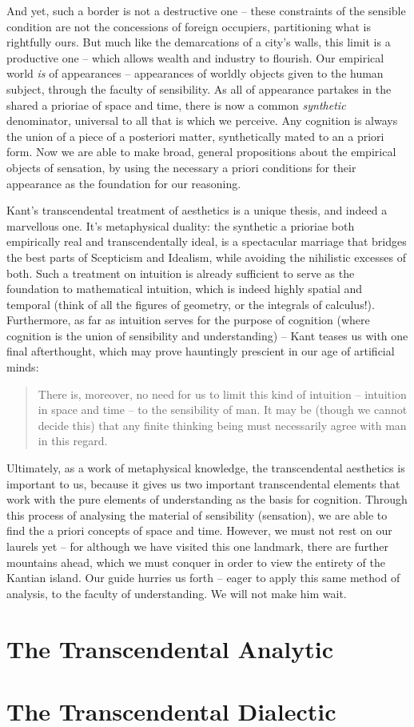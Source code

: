 \noindent
And yet, such a border is not a destructive one -- these constraints of the sensible condition are not the concessions of foreign occupiers, partitioning what is rightfully ours. But much like the demarcations of a city's walls, this limit is a productive one -- which allows wealth and industry to flourish. Our empirical world \emph{is} of appearances -- appearances of worldly objects given to the human subject, through the faculty of sensibility. As all of appearance partakes in the shared a prioriae of space and time, there is now a common \emph{synthetic} denominator, universal to all that is which we perceive. Any cognition is always the union of a piece of a posteriori matter, synthetically mated to an a priori form. Now we are able to make broad, general propositions about the empirical objects of sensation, by using the necessary a priori conditions for their appearance as the foundation for our reasoning.

Kant's transcendental treatment of aesthetics is a unique thesis, and indeed a marvellous one. It's metaphysical duality: the synthetic a prioriae both empirically real and transcendentally ideal, is a spectacular marriage that bridges the best parts of Scepticism and Idealism, while avoiding the nihilistic excesses of both. Such a treatment on intuition is already sufficient to serve as the foundation to mathematical intuition, which is indeed highly spatial and temporal (think of all the figures of geometry, or the integrals of calculus!). Furthermore, as far as intuition serves for the purpose of cognition (where cognition is the union of sensibility and understanding) -- Kant teases us with one final afterthought, which may prove hauntingly prescient in our age of artificial minds:

\begin{quote}
  There is, moreover, no need for us to limit this kind of intuition -- intuition in space and time -- to the sensibility of man. It may be (though we cannot decide this) that any finite thinking being must necessarily agree with man in this regard.

  \autocite[B72]{hackett}
\end{quote}

\noindent
Ultimately, as a work of metaphysical knowledge, the transcendental aesthetics is important to us, because it gives us two important transcendental elements that work with the pure elements of understanding as the basis for cognition. Through this process of analysing the material of sensibility (sensation), we are able to find the a priori concepts of space and time. However, we must not rest on our laurels yet -- for although we have visited this one landmark, there are further mountains ahead, which we must conquer in order to view the entirety of the Kantian island. Our guide hurries us forth -- eager to apply this same method of analysis, to the faculty of understanding. We will not make him wait.

\section*{The Transcendental Analytic}

\section*{The Transcendental Dialectic}

